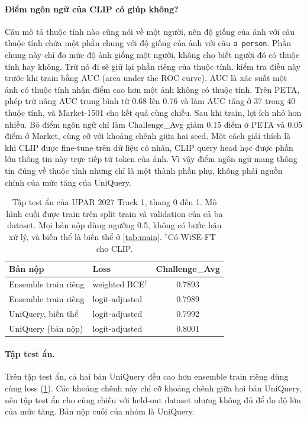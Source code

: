 \documentclass[10pt,twocolumn,letterpaper]{article}
\begin{document}
\paragraph{Điểm ngôn ngữ của CLIP có giúp không?} Câu mô tả thuộc tính nào cũng nói về một người, nên độ giống của ảnh với câu thuộc tính chứa một phần chung với độ giống của ảnh với câu \texttt{a person}. Phần chung này chỉ đo mức độ ảnh giống một người, không cho biết người đó có thuộc tính hay không. Trừ nó đi sẽ giữ lại phần riêng của thuộc tính.  kiểm tra điều này trước khi train bằng AUC (area under the ROC curve). AUC là xác suất một ảnh có thuộc tính nhận điểm cao hơn một ảnh không có thuộc tính. Trên PETA, phép trừ nâng AUC trung bình từ 0.68 lên 0.76 và làm AUC tăng ở 37 trong 40 thuộc tính, và Market-1501 cho kết quả cùng chiều. Sau khi train, lợi ích nhỏ hơn nhiều. Bỏ điểm ngôn ngữ chỉ làm Challenge\_Avg giảm 0.15 điểm ở PETA và 0.05 điểm ở Market, cùng cỡ với khoảng chênh giữa hai seed. Một cách giải thích là khi CLIP được fine-tune trên dữ liệu có nhãn, CLIP query head học được phần lớn thông tin này trực tiếp từ token của ảnh. Vì vậy điểm ngôn ngữ mang thông tin đúng về thuộc tính nhưng chỉ là một thành phần phụ, không phải nguồn chính của mức tăng của UniQuery.

\begin{table}[t]
\centering
\small
\setlength{\tabcolsep}{3pt}
\begin{tabular}{@{}llc@{}}
\toprule
Bản nộp & Loss & Challenge\_Avg \\
\midrule
Ensemble train riêng & weighted BCE$^\dagger$ & 0.7893 \\
Ensemble train riêng & logit-adjusted & 0.7989 \\
UniQuery, biến thể & logit-adjusted & 0.7992 \\
UniQuery (bản nộp) & logit-adjusted & 0.8001 \\
\bottomrule
\end{tabular}
\caption{Tập test ẩn của UPAR 2027 Track 1, thang 0 đến 1. Mô hình cuối được train trên split train và validation của cả ba dataset. Mọi bản nộp dùng ngưỡng 0.5, không có bước hậu xử lý, và biến thể là biến thể ở \cref{tab:main}. $^\dagger$Có WiSE-FT~\cite{wiseft} cho CLIP.}
\label{tab:test}
\end{table}

\paragraph{Tập test ẩn.} Trên tập test ẩn, cả hai bản UniQuery đều cao hơn ensemble train riêng dùng cùng loss (\cref{tab:test}). Các khoảng chênh này chỉ cỡ khoảng chênh giữa hai bản UniQuery, nên tập test ẩn cho cùng chiều với held-out dataset nhưng không đủ để đo độ lớn của mức tăng. Bản nộp cuối của nhóm là UniQuery.
\end{document}
